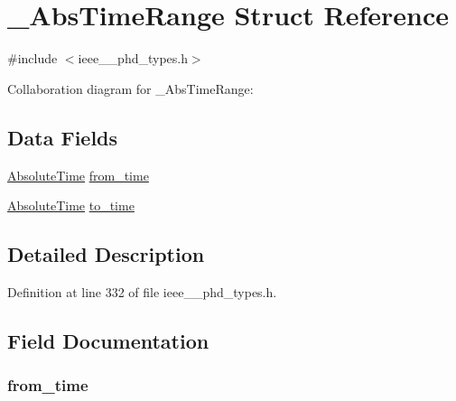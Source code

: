 \hypertarget{struct___abs_time_range}{}\section{\+\_\+\+Abs\+Time\+Range Struct Reference}
\label{struct___abs_time_range}


{\ttfamily \#include $<$ieee\+\_\+\_\+phd\+\_\+types.\+h$>$}



Collaboration diagram for \+\_\+\+Abs\+Time\+Range\+:
\subsection*{Data Fields}
\begin{DoxyCompactItemize}
\item 
\hyperlink{ieee__11073__phd__types_8h_a1c65bab3ee227fd857096278b0f6ae9a}{Absolute\+Time} \hyperlink{struct___abs_time_range_a88b17372a4d0aab65af2b6c99ced1b3a}{from\+\_\+time}
\item 
\hyperlink{ieee__11073__phd__types_8h_a1c65bab3ee227fd857096278b0f6ae9a}{Absolute\+Time} \hyperlink{struct___abs_time_range_a1335ed62b8d883e19b80f371e5d2c730}{to\+\_\+time}
\end{DoxyCompactItemize}


\subsection{Detailed Description}


Definition at line 332 of file ieee\+\_\+\_\+phd\+\_\+types.\+h.



\subsection{Field Documentation}
\hypertarget{struct___abs_time_range_a88b17372a4d0aab65af2b6c99ced1b3a}{}
\subsubsection[{from\+\_\+time}]{ from\+\_\+time}\label{struct___abs_time_range_a88b17372a4d0aab65af2b6c99ced1b3a}



